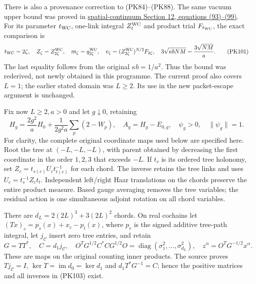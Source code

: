 \documentclass[11pt]{article}
\begin{document}
There is also a provenance correction to (PK84)–(PK88). The same vacuum
upper bound was proved in \href{https://github.com/KokunoYumeto/yang-mills-interacting-workbench/blob/c4a1fd2e34a5d75a5a1b04df4d097f992c345cc7/yang-mills/sources/ym_spatial_continuum_astra_20260908/spatial_continuum.md#L1214}{spatial-continuum Section 12, equations (93)–(99)}.
For its parameter \(t_{\rm WC}\), one-link integral \(Z_t^{\rm WC}\) and
product trial \(F_{t_{\rm WC}}\), the exact comparison is
\[
 t_{\rm WC}=2\zeta,\quad
 Z_\zeta=Z_{2\zeta}^{\rm WC},\quad m_\zeta=q_{2\zeta}^{\rm WC},\quad
 v_\zeta=(Z_{2\zeta}^{\rm WC})^{N/2}F_{2\zeta},\quad
 3\sqrt{\kappa bNM}=\frac{3\sqrt{NM}}a .
 \tag{PK101}
\]
The last equality follows from the original \(\kappa b=1/a^2\).
Thus the bound was rederived, not newly obtained in this programme.
The current proof also covers \(L=1\); the earlier stated domain was
\(L\ge2\). Its use in the new packet-escape argument is unchanged.

Fix now \(L\ge2,a>0\) and let \(g\downarrow0\), retaining
\[
 H_g=\frac{2g^2}{a}H_0+\frac1{2g^2a}\sum_p(2-W_p),\quad
 A_g=H_g-E_{0,g},\quad \psi_g>0,\quad \|\psi_g\|=1.
 \tag{PK102}
\]
For clarity, the complete original coordinate maps used below are
specified here. Root the tree at \((-L,-L,-L)\), with parent obtained
by decreasing the first coordinate in the order \(1,2,3\) that exceeds
\(-L\). If \(t_v\) is its ordered tree holonomy, set
\(Z_c=t_{s(c)}U_ct_{t(c)}^{-1}\) for each chord.
The inverse retains the tree links and uses
\(U_c=t_s^{-1}Z_ct_t\). Independent left/right Haar translations
on the chords preserve the entire product measure. Based gauge
averaging removes the tree variables; the residual action is one
simultaneous adjoint rotation on all chord variables.

There are \(d_L=2(2L)^3+3(2L)^2\) chords. On real cochains let
\((Tx)_c=p_s(x)+x_c-p_t(x)\), where \(p_v\) is the signed additive
tree-path integral, let \(j_{\mathcal C}\) insert zero tree entries,
and retain
\[
 G=TT^*,\quad C=d_1j_{\mathcal C},\quad
 O^TG^{1/2}C^*CG^{1/2}O
       =\operatorname{diag}(\sigma_1^2,\ldots,\sigma_{d_L}^2),\quad
 z^\alpha=O^TG^{-1/2}x^\alpha .
 \tag{PK103}
\]
These are maps on the original counting inner products. The source
proves \(Tj_{\mathcal C}=I\), \(\ker T=\operatorname{im}d_0=\ker d_1\)
and \(d_1T^*G^{-1}=C\); hence the positive matrices and all inverses
in (PK103) exist.
\end{document}
